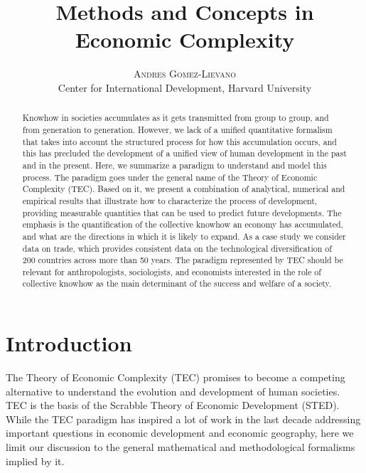 \documentclass[12pt]{article}
\title{\vspace{-15mm}%
	\fontsize{24pt}{10pt}\selectfont
	\textbf{Methods and Concepts in Economic Complexity}
	}
\author{%
	\large
	\textsc{Andres Gomez-Lievano} \\[1.5mm]
	\normalsize	Center for International Development, Harvard University %
	\vspace{-5mm}
	}
\date{}
\begin{document}
\maketitle

\begin{abstract}
Knowhow in societies accumulates as it gets transmitted from group to group, and from generation to generation. 
However, we lack of a unified quantitative formalism that takes into account the structured process for how this accumulation occurs, and this has precluded the development of a unified view of human development in the past and in the present. 
Here, we summarize a paradigm to understand and model this process. 
The paradigm goes under the general name of the Theory of Economic Complexity (TEC). 
Based on it, we present a combination of analytical, numerical and empirical results that illustrate how to characterize the process of development, providing measurable quantities that can be used to predict future developments. 
The emphasis is the quantification of the collective knowhow an economy has accumulated, and what are the directions in which it is likely to expand. 
As a case study we consider data on trade, which provides consistent data on the technological diversification of 200 countries across more than 50 years. 
The paradigm represented by TEC should be relevant for anthropologists, sociologists, and economists interested in the role of collective knowhow as the main determinant of the success and welfare of a society. 
\end{abstract}

\newpage
\tableofcontents

\newpage

\section{Introduction}
The Theory of Economic Complexity (TEC) promises to become a competing alternative to understand the evolution and development of human societies. TEC is the basis of the Scrabble Theory of Economic Development (STED). While the TEC paradigm has inspired a lot of work in the last decade addressing important questions in economic development and economic geography, here we limit our discussion to the general mathematical and methodological formalisms implied by it.
\end{document}
